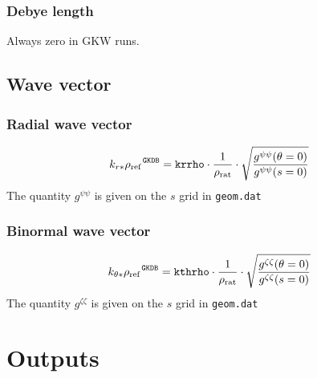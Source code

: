 \documentclass[a4paper]{report}
\begin{document}
\subsection{Debye length}
Always zero in GKW runs.

\section{Wave vector}
\subsection{Radial wave vector}
\begin{equation}
\left. k_{r*}\rho_{\textrm{ref}}\right.^{\texttt{GKDB}} = \texttt{krrho}\cdot\frac{1}{\rho_\textrm{rat}}\cdot\sqrt{\frac{g^{\psi\psi}(\theta=0)}{g^{\psi\psi}(s=0)}}
\end{equation}
The quantity $g^{\psi \psi}$ is given on the $s$ grid in \texttt{geom.dat}

\subsection{Binormal wave vector}
\begin{equation}
\left. k_{\theta*}\rho_{\textrm{ref}}\right.^{\texttt{GKDB}} = \texttt{kthrho}\cdot\frac{1}{\rho_\textrm{rat}}\cdot\sqrt{\frac{g^{\zeta\zeta}(\theta=0)}{g^{\zeta\zeta}(s=0)}}
\end{equation}
The quantity $g^{\zeta \zeta}$ is given on the $s$ grid in \texttt{geom.dat}


\chapter{Outputs}





\end{document}
